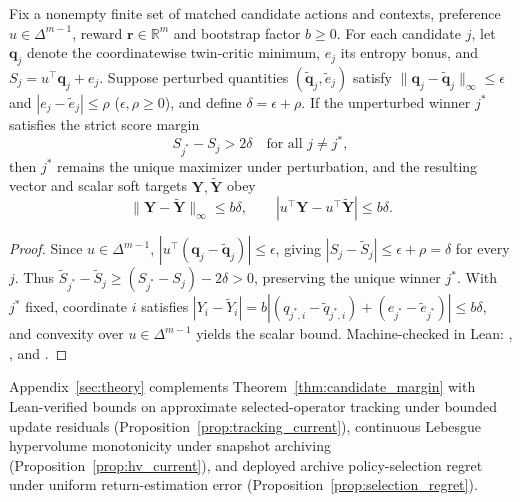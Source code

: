 \begin{theorem}
\label{thm:candidate_margin}
\label{prop:candidate_margin}
Fix a nonempty finite set of matched candidate actions and contexts,
preference $u \in \Delta^{m-1}$,
reward $\mathbf{r} \in \mathbb{R}^m$ and bootstrap factor $b \geq 0$. For each
candidate $j$, let $\mathbf{q}_j$ denote the coordinatewise twin-critic minimum,
$e_j$ its entropy bonus, and $S_j = u^\top\mathbf{q}_j + e_j$. Suppose perturbed
quantities $(\widetilde{\mathbf{q}}_j, \widetilde{e}_j)$ satisfy
$\|\mathbf{q}_j - \widetilde{\mathbf{q}}_j\|_\infty \leq \epsilon$ and
$|e_j - \widetilde{e}_j| \leq \rho$ ($\epsilon, \rho \geq 0$), and define
$\delta = \epsilon + \rho$. If the unperturbed winner $j^*$ satisfies the strict
score margin
\begin{equation}
 S_{j^*} - S_j > 2\delta \quad \text{for all } j \neq j^*,
 \label{eq:main_candidate_margin}
\end{equation}
then $j^*$ remains the unique maximizer under perturbation, and the resulting
vector and scalar soft targets $\mathbf{Y}, \widetilde{\mathbf{Y}}$ obey
\begin{equation}
 \|\mathbf{Y} - \widetilde{\mathbf{Y}}\|_\infty \leq b\delta,
 \qquad
 |u^\top\mathbf{Y} - u^\top\widetilde{\mathbf{Y}}| \leq b\delta.
 \label{eq:margin_target_bound}
\end{equation}
\end{theorem}
\begin{proof}
Since $u \in \Delta^{m-1}$, $|u^\top(\mathbf{q}_j - \widetilde{\mathbf{q}}_j)| \leq \epsilon$,
giving $|S_j - \widetilde{S}_j| \leq \epsilon + \rho = \delta$ for every $j$.
Thus $\widetilde{S}_{j^*} - \widetilde{S}_j \geq (S_{j^*} - S_j) - 2\delta > 0$,
preserving the unique winner $j^*$. With $j^*$ fixed, coordinate $i$ satisfies
$|Y_i - \widetilde{Y}_i| = b|(q_{j^*,i} - \widetilde{q}_{j^*,i}) + (e_{j^*} - \widetilde{e}_{j^*})| \leq b\delta$,
and convexity over $u \in \Delta^{m-1}$ yields the scalar bound. Machine-checked
in Lean: , ,
and .
\end{proof}

Appendix~\ref{sec:theory} complements Theorem~\ref{thm:candidate_margin} with
Lean-verified bounds on approximate selected-operator tracking under bounded
update residuals (Proposition~\ref{prop:tracking_current}), continuous Lebesgue
hypervolume monotonicity under snapshot archiving (Proposition~\ref{prop:hv_current}),
and deployed archive policy-selection regret under uniform return-estimation
error (Proposition~\ref{prop:selection_regret}).
